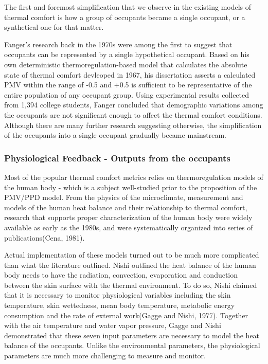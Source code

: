 
The first and foremost simplification that we observe in the existing models of thermal comfort is how a group of occupants became a single occupant, or a synthetical one for that matter.

Fanger's research back in the 1970s were among the first to suggest that occupants can be represented by a single hypothetical occupant\cite{fanger_thermal_1970}. Based on his own deterministic thermoregulation-based model that calculates the absolute state of thermal comfort devleoped in 1967\cite{fanger_calculation_1967}, his dissertation asserts a calculated PMV within the range of -0.5 and +0.5 is sufficient to be representative of the entire population of any occupant group. Using experimental results collected from 1,394 college students, Fanger concluded that demographic variations among the occupants are not significant enough to affect the thermal comfort conditions. Although there are many further research suggesting otherwise\cite{kingma_energy_2015,wang_individual_2018}, the simplification of the occupants into a single occupant gradually became mainstream\cite{ansi/ashrae_standard_2017}.


\subsubsection{Physiological Feedback - Outputs from the occupants}
	Most of the popular thermal comfort metrics relies on thermoregulation models of the human body - which is a subject well-studied prior to the proposition of the PMV/PPD model\cite{fanger_thermal_1972}. From the physics of the microclimate, measurement and models of the human heat balance and their relationship to thermal comfort, research that supports proper characterization of the human body were widely available as early as the 1980s, and were systematically organized into series of publications(Cena, 1981). 

	Actual implementation of these models turned out to be much more complicated than what the literature outlined. Nishi outlined the heat balance of the human body needs to have the radiation, convection, evaporation and conduction between the skin surface with the thermal environment. To do so, Nishi claimed that it is necessary to monitor physiological variables including the skin temperature, skin wettedness, mean body temperature, metabolic energy consumption and the rate of external work(Gagge and Nishi, 1977). Together with the air temperature and water vapor pressure, Gagge and Nishi demonstrated that these seven input parameters are necessary to model the heat balance of the occupants. Unlike the environmental parameters, the physiological parameters are much more challenging to measure and monitor.

